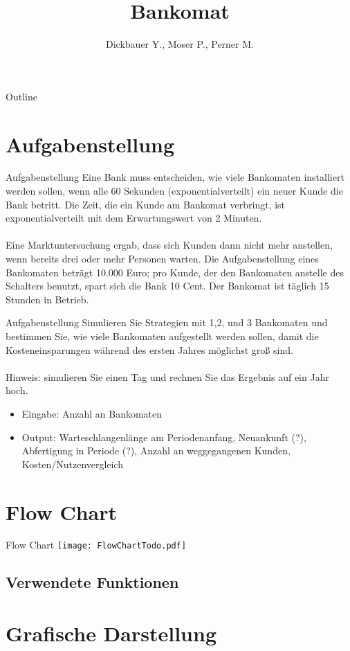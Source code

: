 

\title[BSP29 - Bankomat]{Bankomat}
\author{Dickbauer Y., Moser P., Perner M.}



\begin{frame}
  \titlepage
\end{frame}

\begin{frame}{Outline}
  \tableofcontents
\end{frame}

\section{Aufgabenstellung}
\begin{frame}{Aufgabenstellung}
Eine Bank muss entscheiden, wie viele Bankomaten installiert werden sollen, wenn alle 60 Sekunden (exponentialverteilt) ein neuer Kunde die Bank betritt. Die Zeit, die ein Kunde am Bankomat verbringt, ist exponentialverteilt mit dem Erwartungswert von 2 Minuten.
\\~\\
Eine Marktuntersuchung ergab, dass sich Kunden dann nicht mehr anstellen, wenn bereits drei oder mehr Personen warten. Die Aufgabenstellung eines Bankomaten beträgt 10.000 Euro; pro Kunde, der den Bankomaten anstelle des Schalters benutzt, spart sich die Bank 10 Cent. Der Bankomat ist täglich 15 Stunden in Betrieb.
\end{frame}

\begin{frame}{Aufgabenstellung}
Simulieren Sie Strategien mit 1,2, und 3 Bankomaten und bestimmen Sie, wie viele Bankomaten aufgestellt werden sollen, damit die Kosteneinsparungen während des ersten Jahres möglichst groß sind.
\\~\\
Hinweis: simulieren Sie einen Tag und rechnen Sie das Ergebnis auf ein Jahr hoch.
\vspace{1cm}
\begin{itemize}
  \item Eingabe: Anzahl an Bankomaten
  \item Output: Warteschlangenlänge am Periodenanfang, Neuankunft (?), Abfertigung in Periode (?), Anzahl an weggegangenen Kunden, Kosten/Nutzenvergleich
\end{itemize}
\end{frame}

\section{Flow Chart}
\begin{frame}{Flow Chart}
	\centering
  	\texttt{[image: FlowChartTodo.pdf]}
\end{frame}

\subsection{Verwendete Funktionen}
%

\section{Grafische Darstellung}


